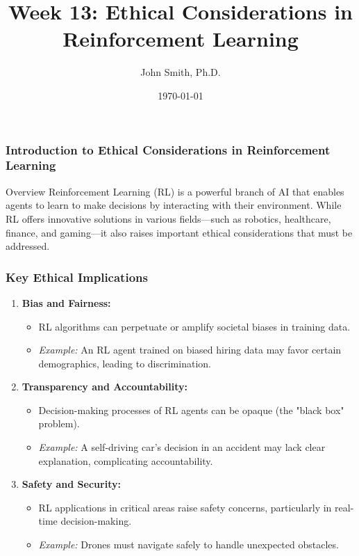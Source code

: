\documentclass[aspectratio=169]{beamer}
\title[Ethics in Reinforcement Learning]{Week 13: Ethical Considerations in Reinforcement Learning}
\author[J. Smith]{John Smith, Ph.D.}
\institute[University Name]{
  Department of Computer Science\\
  University Name\\
  \vspace{0.3cm}
  Email: email@university.edu\\
  Website: www.university.edu
}
\date{\today}
\begin{document}
\frame{\titlepage}

\begin{frame}[fragile]
    \frametitle{Introduction to Ethical Considerations in Reinforcement Learning}
    \begin{block}{Overview}
        Reinforcement Learning (RL) is a powerful branch of AI that enables agents to learn to make decisions by interacting with their environment. 
        While RL offers innovative solutions in various fields—such as robotics, healthcare, finance, and gaming—it also raises important ethical considerations that must be addressed.
    \end{block}
\end{frame}

\begin{frame}[fragile]
    \frametitle{Key Ethical Implications}
    \begin{enumerate}
        \item \textbf{Bias and Fairness:}
            \begin{itemize}
                \item RL algorithms can perpetuate or amplify societal biases in training data.
                \item \textit{Example:} An RL agent trained on biased hiring data may favor certain demographics, leading to discrimination.
            \end{itemize}
        \item \textbf{Transparency and Accountability:}
            \begin{itemize}
                \item Decision-making processes of RL agents can be opaque (the "black box" problem).
                \item \textit{Example:} A self-driving car's decision in an accident may lack clear explanation, complicating accountability.
            \end{itemize}
        \item \textbf{Safety and Security:}
            \begin{itemize}
                \item RL applications in critical areas raise safety concerns, particularly in real-time decision-making.
                \item \textit{Example:} Drones must navigate safely to handle unexpected obstacles.
            \end{itemize}
    \end{enumerate}
\end{frame}
\end{document}
